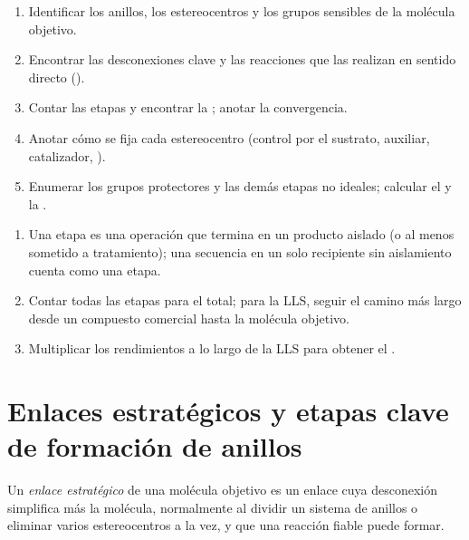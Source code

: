 \begin{method}\label{met:b3:total-synthesis:analyse}
\begin{enumerate}
  \item Identificar los anillos, los estereocentros y los grupos sensibles de la molécula objetivo.
  \item Encontrar las desconexiones clave y las reacciones que las realizan en sentido
        directo ().
  \item Contar las etapas y encontrar la ; anotar la convergencia.
  \item Anotar cómo se fija cada estereocentro (control por el sustrato, auxiliar, catalizador,
        ).
  \item Enumerar los grupos protectores y las demás etapas no ideales; calcular el  y la .
\end{enumerate}
\end{method}

\begin{method}\label{met:b3:total-synthesis:count}
\begin{enumerate}
  \item Una etapa es una operación que termina en un producto aislado (o al menos sometido a tratamiento);
        una secuencia en un solo recipiente sin aislamiento cuenta como una etapa.
  \item Contar todas las etapas para el total; para la LLS, seguir el camino más largo desde un
        compuesto comercial hasta la molécula objetivo.
  \item Multiplicar los rendimientos a lo largo de la LLS para obtener el .
\end{enumerate}
\end{method}

\section{Enlaces estratégicos y etapas clave de formación de anillos}

\begin{definition}\label{def:b3:total-synthesis:strategic-bond}
Un \emph{enlace estratégico} de una molécula objetivo es un enlace cuya
desconexión simplifica más la molécula, normalmente al dividir un sistema de anillos
o eliminar varios estereocentros a la vez, y que una reacción fiable puede
formar.
\end{definition}

